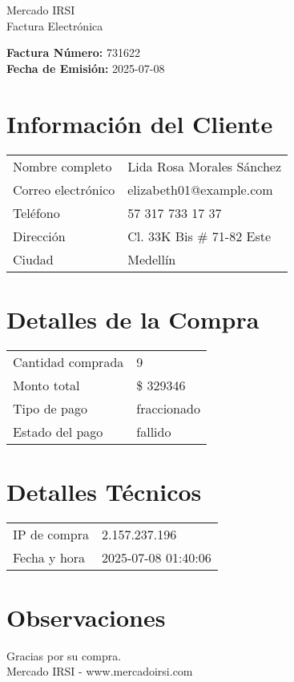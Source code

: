 \documentclass[12pt]{article}
\begin{document}
\begin{center}
    \Huge Mercado IRSI \\
    \Large Factura Electrónica
\end{center}

\vspace{0.5cm}

\noindent \textbf{Factura Número:} 731622 \\
\textbf{Fecha de Emisión:} 2025-07-08

\vspace{0.5cm}

\section*{Información del Cliente}
\begin{longtable}{ll}
Nombre completo & Lida Rosa Morales Sánchez \\
Correo electrónico & elizabeth01@example.com \\
Teléfono & 57 317 733 17 37 \\
Dirección & Cl. 33K Bis \# 71-82 Este \\
Ciudad & Medellín \\
\end{longtable}

\vspace{0.5cm}

\section*{Detalles de la Compra}
\begin{longtable}{ll}
Cantidad comprada & 9 \\
Monto total & \$ 329346 \\
Tipo de pago & fraccionado \\
Estado del pago & fallido \\
\end{longtable}

\vspace{0.5cm}

\section*{Detalles Técnicos}
\begin{longtable}{ll}
IP de compra & 2.157.237.196 \\
Fecha y hora & 2025-07-08 01:40:06 \\
\end{longtable}

\vspace{0.5cm}

\section*{Observaciones}


\vspace{0.5cm}

\begin{center}
    Gracias por su compra. \\
    Mercado IRSI - www.mercadoirsi.com
\end{center}
\end{document}
